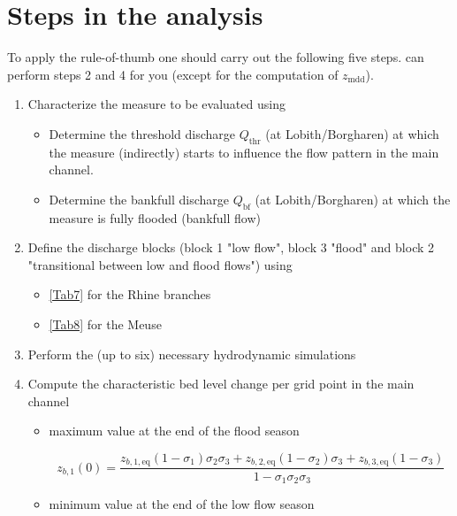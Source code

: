 \chapter{Steps in the analysis}

To apply the rule-of-thumb one should carry out the following five steps.
\dfastmi can perform steps 2 and 4 for you (except for the computation of $z_\text{mdd}$).

\begin{enumerate}
\item Characterize the measure to be evaluated using \dfastmi

\begin{itemize}
\item Determine the threshold discharge $Q_\text{thr}$ (at Lobith/Borgharen) at which the measure (indirectly) starts to influence the flow pattern in the main channel.

\item Determine the bankfull discharge $Q_\text{bf}$ (at Lobith/Borgharen) at which the measure is fully flooded (bankfull flow)
\end{itemize}

\item Define the discharge blocks (block 1 "low flow", block 3 "flood" and block 2 "transitional between low and flood flows") using

\begin{itemize}
\item \autoref{Tab7} for the Rhine branches
\item \autoref{Tab8} for the Meuse
\end{itemize}

\item Perform the (up to six) necessary hydrodynamic simulations

\item Compute the characteristic bed level change per grid point in the main channel

\begin{itemize}
\item maximum value  at the end of the flood season

\begin{equation}
z_{b,1}(0) = \frac{z_{b,1,\text{eq}} (1-\sigma_1) \sigma_2 \sigma_3 + z_{b,2,\text{eq}} (1-\sigma_2) \sigma_3 + z_{b,3,\text{eq}} (1-\sigma_3)}{1 - \sigma_1 \sigma_2 \sigma_3}
\end{equation}

\item minimum value  at the end of the low flow season


\end{itemize}
\end{enumerate}
